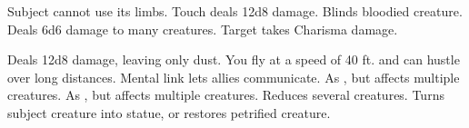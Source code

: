 \begin{swspelllist}
   Subject cannot use its limbs. 
   Touch deals 12d8 damage.
   Blinds bloodied creature.
   Deals 6d6 damage to many creatures.
   Target takes Charisma damage.
  \spellheadrestricted{}

   Deals 12d8 damage, leaving only dust.
   You fly at a speed of 40 ft. and can hustle over long distances.
   Mental link lets allies communicate.
   As , but affects multiple creatures.
   As , but affects multiple creatures.
   Reduces several creatures.
   Turns subject creature into statue, or restores petrified creature.
\end{swspelllist}

